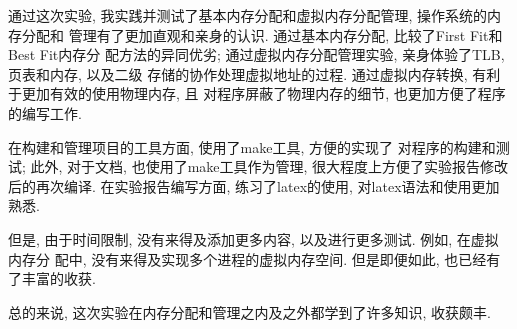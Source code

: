 \label{ssub:实验心得}
通过这次实验, 我实践并测试了基本内存分配和虚拟内存分配管理, 操作系统的内存分配和
管理有了更加直观和亲身的认识. 通过基本内存分配, 比较了First Fit和Best Fit内存分
配方法的异同优劣; 通过虚拟内存分配管理实验, 亲身体验了TLB, 页表和内存, 以及二级
存储的协作处理虚拟地址的过程. 通过虚拟内存转换, 有利于更加有效的使用物理内存, 且
对程序屏蔽了物理内存的细节, 也更加方便了程序的编写工作.\par

在构建和管理项目的工具方面, 使用了make工具, 方便的实现了
对程序的构建和测试; 此外, 对于文档, 也使用了make工具作为管理,
很大程度上方便了实验报告修改后的再次编译. 在实验报告编写方面,
练习了latex的使用, 对latex语法和使用更加熟悉.\par

但是, 由于时间限制, 没有来得及添加更多内容, 以及进行更多测试. 例如, 在虚拟内存分
配中, 没有来得及实现多个进程的虚拟内存空间. 但是即便如此, 也已经有了丰富的收获.

总的来说, 这次实验在内存分配和管理之内及之外都学到了许多知识, 收获颇丰.
